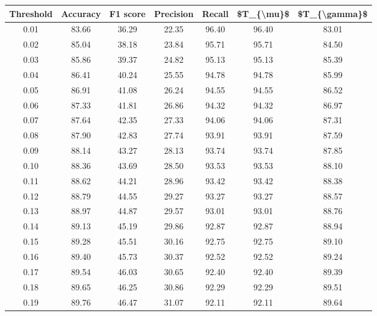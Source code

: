 \begin{tabular}{|c|c|c|c|c|c|c|}
\hline
 Threshold &  Accuracy &  F1 score &  Precision &  Recall &  \$T\_\{\textbackslash mu\}\$ &  \$T\_\{\textbackslash gamma\}\$ \\
\hline
      0.01 &     83.66 &     36.29 &      22.35 &   96.40 &      96.40 &         83.01 \\
      0.02 &     85.04 &     38.18 &      23.84 &   95.71 &      95.71 &         84.50 \\
      0.03 &     85.86 &     39.37 &      24.82 &   95.13 &      95.13 &         85.39 \\
      0.04 &     86.41 &     40.24 &      25.55 &   94.78 &      94.78 &         85.99 \\
      0.05 &     86.91 &     41.08 &      26.24 &   94.55 &      94.55 &         86.52 \\
      0.06 &     87.33 &     41.81 &      26.86 &   94.32 &      94.32 &         86.97 \\
      0.07 &     87.64 &     42.35 &      27.33 &   94.06 &      94.06 &         87.31 \\
      0.08 &     87.90 &     42.83 &      27.74 &   93.91 &      93.91 &         87.59 \\
      0.09 &     88.14 &     43.27 &      28.13 &   93.74 &      93.74 &         87.85 \\
      0.10 &     88.36 &     43.69 &      28.50 &   93.53 &      93.53 &         88.10 \\
      0.11 &     88.62 &     44.21 &      28.96 &   93.42 &      93.42 &         88.38 \\
      0.12 &     88.79 &     44.55 &      29.27 &   93.27 &      93.27 &         88.57 \\
      0.13 &     88.97 &     44.87 &      29.57 &   93.01 &      93.01 &         88.76 \\
      0.14 &     89.13 &     45.19 &      29.86 &   92.87 &      92.87 &         88.94 \\
      0.15 &     89.28 &     45.51 &      30.16 &   92.75 &      92.75 &         89.10 \\
      0.16 &     89.40 &     45.73 &      30.37 &   92.52 &      92.52 &         89.24 \\
      0.17 &     89.54 &     46.03 &      30.65 &   92.40 &      92.40 &         89.39 \\
      0.18 &     89.65 &     46.25 &      30.86 &   92.29 &      92.29 &         89.51 \\
      0.19 &     89.76 &     46.47 &      31.07 &   92.11 &      92.11 &         89.64 \\

\end{tabular}
